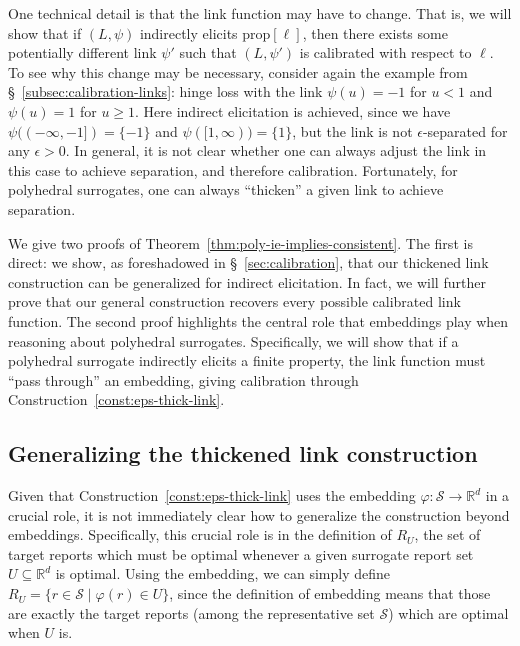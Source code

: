 \documentclass[twoside,11pt]{article}
\newcommand{\reals}{\mathbb{R}}
\newcommand{\prop}[1]{\mathrm{prop}[#1]}
\newcommand{\Sc}{\mathcal{S}}
\begin{document}
One technical detail is that the link function may have to change.
That is, we will show that if $(L,\psi)$ indirectly elicits $\prop{\ell}$, then there exists some potentially different link $\psi'$ such that $(L,\psi')$ is calibrated with respect to $\ell$.
To see why this change may be necessary, consider again the example from \S~\ref{subsec:calibration-links}:
hinge loss with the link $\psi(u) = -1$ for $u < 1$ and $\psi(u) = 1$ for $u\geq 1$.
Here indirect elicitation is achieved, since we have $\psi((-\infty,-1]) = \{-1\}$ and $\psi([1,\infty)) = \{1\}$, but the link is not $\epsilon$-separated for any $\epsilon>0$.
In general, it is not clear whether one can always adjust the link in this case to achieve separation, and therefore calibration.
Fortunately, for polyhedral surrogates, one can always ``thicken'' a given link to achieve separation.

We give two proofs of Theorem~\ref{thm:poly-ie-implies-consistent}.
The first is direct: we show, as foreshadowed in \S~\ref{sec:calibration}, that our thickened link construction can be generalized for indirect elicitation.
In fact, we will further prove that our general construction recovers every possible calibrated link function.
The second proof highlights the central role that embeddings play when reasoning about polyhedral surrogates.
Specifically, we will show that if a polyhedral surrogate indirectly elicits a finite property, the link function must ``pass through'' an embedding, giving calibration through Construction~\ref{const:eps-thick-link}.

\subsection{Generalizing the thickened link construction}

Given that Construction~\ref{const:eps-thick-link} uses the embedding $\varphi:\Sc\to\reals^d$ in a crucial role, it is not immediately clear how to generalize the construction beyond embeddings.
Specifically, this crucial role is in the definition of $R_U$, the set of target reports which must be optimal whenever a given surrogate report set $U\subseteq\reals^d$ is optimal.
Using the embedding, we can simply define $R_U = \{ r\in\Sc \mid \varphi(r) \in U \}$, since the definition of embedding means that those are exactly the target reports (among the representative set $\Sc$) which are optimal when $U$ is.
\end{document}
